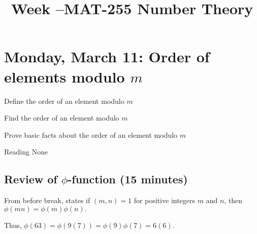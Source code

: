 \documentclass[letterpaper, 11 pt]{ximera}
\title{Week \week--MAT-255 Number Theory}
\theoremstyle{definition}
\begin{document}
\section{Monday, March 11: Order of elements modulo $m$}

\begin{obj}
\item Define the order of an element modulo $m$
\item Find the order of an element modulo $m$
\item Prove basic facts about the order of an element modulo $m$
\end{obj}


\begin{pre}
    \item[Reading] None
\end{pre}

\subsection{Review of $\phi$-function (15 minutes)}

\begin{remark}
    From before break,  states if $(m,n)=1$ for positive integers $m$ and $n$, then $\phi(mn)=\phi(m)\phi(n).$ 

    Thus, $\phi(63)=\phi(9(7))=\phi(9)\phi(7)=6(6).$
\end{remark}
\end{document}
